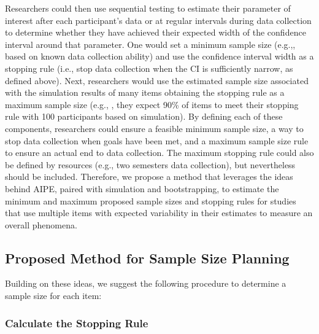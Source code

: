 \documentclass[
  man]{apa7}
\begin{document}
Researchers could then use sequential testing to estimate their parameter of interest after each participant's data or at regular intervals during data collection to determine whether they have achieved their expected width of the confidence interval around that parameter. One would set a minimum sample size (e.g.,, based on known data collection ability) and use the confidence interval width as a stopping rule (i.e., stop data collection when the CI is sufficiently narrow, as defined above). Next, researchers would use the estimated sample size associated with the simulation results of many items obtaining the stopping rule as a maximum sample size (e.g., , they expect 90\% of items to meet their stopping rule with 100 participants based on simulation). By defining each of these components, researchers could ensure a feasible minimum sample size, a way to stop data collection when goals have been met, and a maximum sample size rule to ensure an actual end to data collection. The maximum stopping rule could also be defined by resources (e.g., two semesters data collection), but nevertheless should be included. Therefore, we propose a method that leverages the ideas behind AIPE, paired with simulation and bootstrapping, to estimate the minimum and maximum proposed sample sizes and stopping rules for studies that use multiple items with expected variability in their estimates to measure an overall phenomena.

\hypertarget{proposed-method-for-sample-size-planning}{%
\subsection{Proposed Method for Sample Size Planning}\label{proposed-method-for-sample-size-planning}}

Building on these ideas, we suggest the following procedure to determine a sample size for each item:

\hypertarget{calculate-the-stopping-rule}{%
\subsubsection{Calculate the Stopping Rule}\label{calculate-the-stopping-rule}}
\end{document}
